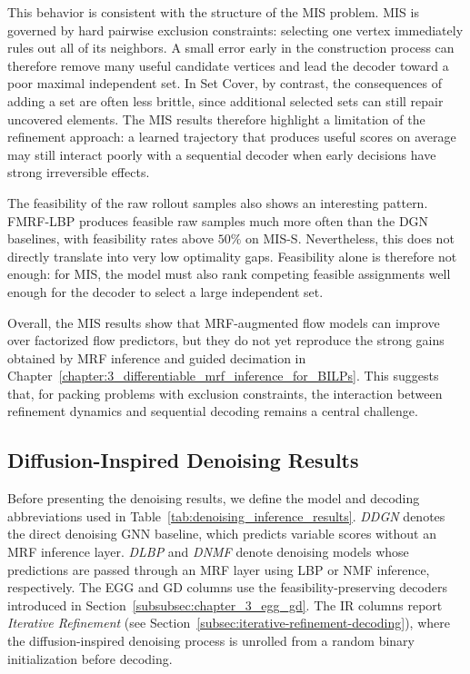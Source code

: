 This behavior is consistent with the structure of the MIS problem. MIS is governed by hard pairwise exclusion constraints: selecting one vertex immediately rules out all of its neighbors. A small error early in the construction process can therefore remove many useful candidate vertices and lead the decoder toward a poor maximal independent set. In Set Cover, by contrast, the consequences of adding a set are often less brittle, since additional selected sets can still repair uncovered elements. The MIS results therefore highlight a limitation of the refinement approach: a learned trajectory that produces useful scores on average may still interact poorly with a sequential decoder when early decisions have strong irreversible effects.

The feasibility of the raw rollout samples also shows an interesting pattern. FMRF-LBP produces feasible raw samples much more often than the DGN baselines, with feasibility rates above $50\%$ on MIS-S. Nevertheless, this does not directly translate into very low optimality gaps. Feasibility alone is therefore not enough: for MIS, the model must also rank competing feasible assignments well enough for the decoder to select a large independent set.

Overall, the MIS results show that MRF-augmented flow models can improve over factorized flow predictors, but they do not yet reproduce the strong gains obtained by MRF inference and guided decimation in Chapter~\ref{chapter:3_differentiable_mrf_inference_for_BILPs}. This suggests that, for packing problems with exclusion constraints, the interaction between refinement dynamics and sequential decoding remains a central challenge.

\subsection{Diffusion-Inspired Denoising Results}
\label{subsec:diffusion_denoising_results}

Before presenting the denoising results, we define the model and decoding abbreviations used in Table~\ref{tab:denoising_inference_results}. \emph{DDGN} denotes the direct denoising GNN baseline, which predicts variable scores without
an MRF inference layer. \emph{DLBP} and \emph{DNMF} denote denoising models whose predictions are passed through an MRF layer using LBP or NMF inference, respectively. The EGG and GD columns use the feasibility-preserving decoders introduced in Section~\ref{subsubsec:chapter_3_egg_gd}. The IR columns report \emph{Iterative Refinement} (see Section~\ref{subsec:iterative-refinement-decoding}), where the diffusion-inspired denoising process is unrolled from a random binary initialization before decoding. 

